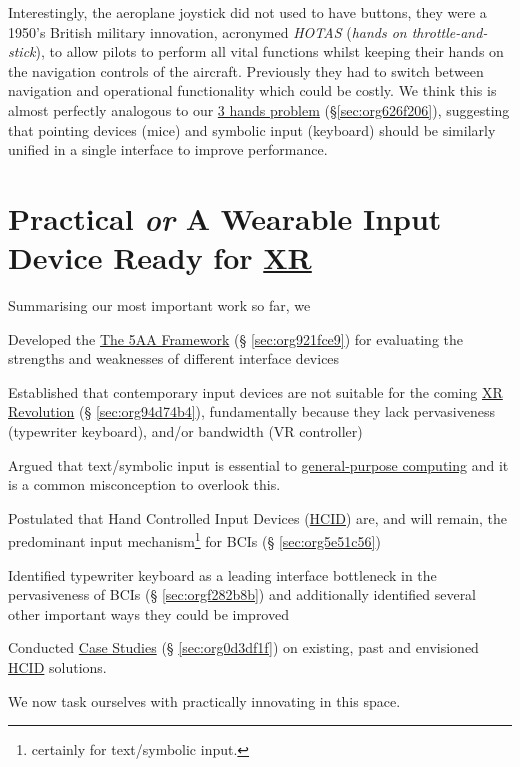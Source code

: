 \documentclass[logo,bsc,singlespacing,parskip]{infthesis}
\begin{document}
Interestingly, the aeroplane joystick did not used to have buttons, they were a 1950's British military innovation, acronymed \emph{HOTAS} (\emph{hands on throttle-and-stick}), to allow pilots to perform all vital functions whilst keeping their hands on the navigation controls of the aircraft.
Previously they had to switch between navigation and operational functionality which could be costly.
We think this is almost perfectly analogous to our \hyperref[sec:org626f206]{3 hands problem} (\S \ref{sec:org626f206}), suggesting that pointing devices (mice) and symbolic input (keyboard) should be similarly unified in a single interface to improve performance.

\part{Practical \emph{or} A Wearable Input Device Ready for \hyperref[org1d567af]{XR}}
\label{sec:org462bb32}
Summarising our most important work so far, we
\begin{enumerate*}[label={\arabic*)}, itemjoin={, \,}, itemjoin*={, and \,}]
\item Developed the \hyperref[sec:org921fce9]{The 5AA Framework} (§ \ref{sec:org921fce9}) for evaluating the strengths and weaknesses of different interface devices
\item Established that contemporary input devices are not suitable for the coming \hyperref[sec:org94d74b4]{XR Revolution} (§ \ref{sec:org94d74b4}), fundamentally because they lack pervasiveness (typewriter keyboard), and/or bandwidth (VR controller)
\item Argued that text/symbolic input is essential to \hyperref[orga7e7736]{general-purpose computing} and it is a common misconception to overlook this.
\item Postulated that Hand Controlled Input Devices (\hyperref[orgc00eca5]{HCID}) are, and will remain, the predominant input mechanism\footnote{certainly for text/symbolic input.} for BCIs (§ \ref{sec:org5e51c56})
\item Identified typewriter keyboard as a leading interface bottleneck in the pervasiveness of BCIs (§ \ref{sec:orgf282b8b}) and additionally identified several other important ways they could be improved
\item Conducted \hyperref[sec:org0d3df1f]{Case Studies} (§ \ref{sec:org0d3df1f}) on existing, past and envisioned \hyperref[orgc00eca5]{HCID} solutions.
\end{enumerate*}
We now task ourselves with practically innovating in this space. \medskip
\end{document}
